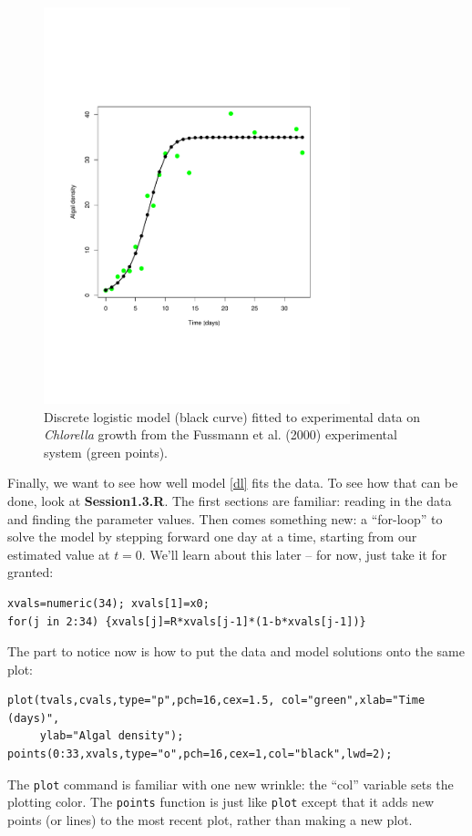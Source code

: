 \documentclass [11pt]{article}
\newcommand{\blst}{\vspace{-0.035in} \begin{lstlisting}}
\newcommand{\ttt}[1]{\texttt{#1}}
\numberwithin{exercise}{section}
\begin{document}
\begin{figure}[t]
\centerline{\includegraphics[width=3.5in]{figures/Session1-Fig3.pdf}}
\caption{\small{Discrete logistic model (black curve) fitted to experimental data on \textit{Chlorella} growth from
the Fussmann et al. (2000) experimental system (green points).}}
\label{Session1Fig3}
\end{figure}

Finally, we want to see how well model \eqref{dl} fits the data. To see how that
can be done, look at \textbf{Session1.3.R}. The first sections are familiar:
reading in the data and finding the parameter values. Then comes something
new: a ``for-loop'' to solve the model by stepping forward one day at a time,
starting from our estimated value at $t=0$.
We'll learn about this later -- for now, just take it for granted: 
\blst
xvals=numeric(34); xvals[1]=x0; 
for(j in 2:34) {xvals[j]=R*xvals[j-1]*(1-b*xvals[j-1])}
\end{lstlisting} 
The part to notice now is how to put the data and model solutions onto the
same plot:
\blst
plot(tvals,cvals,type="p",pch=16,cex=1.5, col="green",xlab="Time (days)",
     ylab="Algal density"); 
points(0:33,xvals,type="o",pch=16,cex=1,col="black",lwd=2); 
\end{lstlisting} 
The \texttt{plot} command is familiar with one new wrinkle: the ``col'' variable sets the 
plotting color. The \ttt{points} function is just like \ttt{plot} except that 
it adds new points (or lines) to the most recent plot, rather than making a new plot. 
\end{document}
